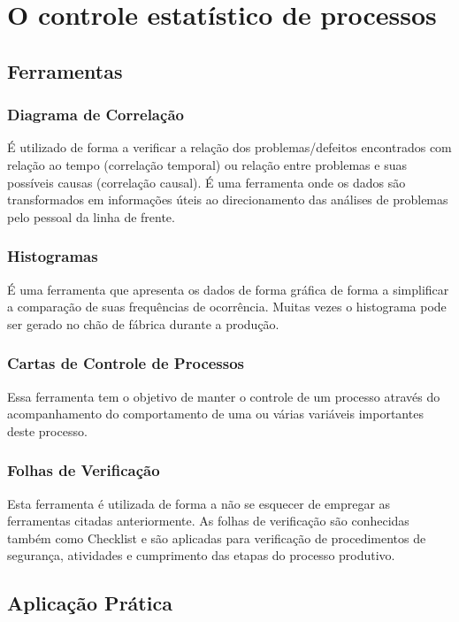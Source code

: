 \chapter{O controle estatístico de processos}
\label{chap:controle_estatistico_de_processos}



\section{Ferramentas}
\label{sec:controle_estatistico_sec1}

\subsection{Diagrama de Correlação}
É utilizado de forma a verificar a relação dos problemas/defeitos encontrados com relação ao tempo (correlação temporal) ou relação entre problemas e suas possíveis causas (correlação causal). É uma ferramenta onde os dados são transformados em informações úteis ao direcionamento das análises de problemas pelo pessoal da linha de frente.

\subsection{Histogramas}
É uma ferramenta que apresenta os dados de forma gráfica de forma a simplificar a comparação de suas frequências de ocorrência. Muitas vezes o histograma pode ser gerado no chão de fábrica durante a produção.

\subsection{Cartas de Controle de Processos}
Essa ferramenta tem o objetivo de manter o controle de um processo através do acompanhamento do comportamento de uma ou várias variáveis importantes deste processo.

\subsection{Folhas de Verificação}
Esta ferramenta é utilizada de forma a não se esquecer de empregar as ferramentas citadas anteriormente. As folhas de verificação são conhecidas também como Checklist e são aplicadas para verificação de procedimentos de segurança, atividades e cumprimento das etapas do processo produtivo.




\section{Aplicação Prática}
\label{sec:controle_estatistico_aplicacao}
